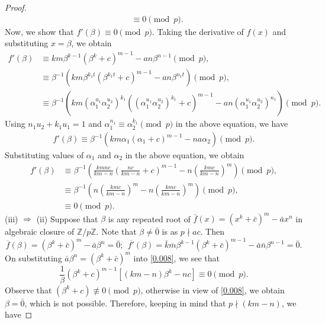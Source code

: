 \documentclass[table]{amsart}
\newcommand{\Z}{\mathbb{Z}}
\numberwithin{equation}{section}
\begin{document}
\begin{proof}
\begin{align*}
			&\equiv0\pmod{p}.
		\end{align*}
		Now, we show that $f'(\beta)\equiv 0 \pmod{p}$. Taking the derivative of $f(x)$ and substituting $x=\beta$, we obtain
		\begin{align*}
				f'(\beta)&\equiv km\beta^{k-1}(\beta^{k}+c)^{m-1} - an\beta^{n-1}\pmod{p},\\
					&\equiv \beta^{-1} \left(km\beta^{k_1t}(\beta^{k_1t}+c)^{m-1} - an\beta^{n_1t} \right)\pmod{p},\\
				&\equiv \beta^{-1} \left(km(\alpha_1^{u_1}\alpha_2^{u_2})^{k_1}((\alpha_1^{u_1}\alpha_2^{u_2})^{k_1}+c)^{m-1} -an(\alpha_1^{u_1}\alpha_2^{u_2})^{n_1}\right)\pmod{p}.
				\end{align*}
				Using $n_1u_2+k_1u_1=1$ and  $\alpha_{1}^{n_1}\equiv\alpha_2^{k_1}\pmod{p}$ in the above equation, we have
				\begin{align*}
				f'(\beta)	\equiv \beta^{-1} \left(km\alpha_{1}(\alpha_{1}+c)^{m-1} - n a\alpha_2 \right)\pmod{p}.
				\end{align*}		
				Substituting values of $\alpha_1$ and $\alpha_{2}$ in the above equation, we obtain
				\begin{align}
				f'(\beta)&\equiv \beta^{-1} \left( \frac{kmnc}{km-n} \left( \frac{nc}{km-n} + c \right)^{m-1} -n \left( \frac{kmc}{km-n} \right)^m \right) \pmod{p},\nonumber\\
				&\equiv \beta^{-1} \left(n\left(\frac{kmc}{km-n}\right)^m - n \left(\frac{kmc}{km-n}\right)^{m}\right) \pmod{p},\nonumber\\
				&\equiv 0 \pmod{p}.
				\end{align}
		\noindent  (iii) $\Rightarrow $ (ii)
		Suppose that $\beta$ is any repeated root of $\bar f (x)= ( x^k+\bar c)^m - \bar a x^n$ in algebraic closure of $\Z/p\Z.$  Note that $\beta \neq \bar{0}$ is as $p\nmid ac$. Then
		\begin{equation}\label {0.008}
			\overline{f}(\beta) = ({\beta}^k+\bar c)^m -\bar a {\beta}^n = \bar{0};~~	\overline{f'}(\beta)= \bar k \overline m \beta^{k-1}({\beta}^k+\bar c)^{m-1} -\bar a \bar{n}{\beta}^{n-1} = \bar{0}. 
		\end{equation}
			On substituting $ \bar a {\beta}^{n} = ({\beta}^k+\bar c)^m$ into \eqref{0.008}, we see that
		\begin{equation}
			\frac{1}{\beta}(\beta^k+c)^{m-1} \left[ (km-n) \beta^k - nc\right] \equiv 0 \pmod{p}.
		\end{equation}
		Observe that $(\beta^k+c) \not\equiv 0\pmod{p}$, otherwise in view  of \eqref{0.008}, we obtain $\beta=\bar 0$, which is not possible. Therefore, keeping in mind that $p\nmid (km-n)$, we have

\end{proof}
\end{document}
